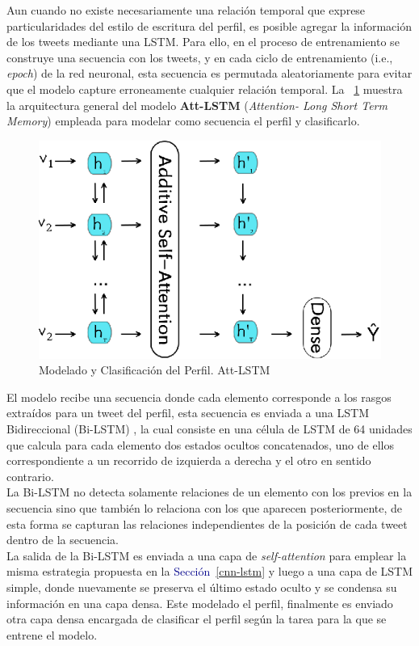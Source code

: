 	Aun cuando no existe necesariamente una relación temporal que exprese particularidades del estilo de escritura del perfil, es posible agregar la información de los tweets mediante una LSTM. Para ello, en el proceso de entrenamiento se construye una secuencia con los tweets, y en cada ciclo de entrenamiento (i.e., \textit{epoch}) de la red neuronal, esta secuencia es permutada aleatoriamente para evitar que el modelo capture erroneamente cualquier relación temporal. La \figurename~\ref{att_lstm} muestra la arquitectura general del modelo \textbf{Att-LSTM} (\textit{Attention- Long Short Term Memory}) empleada para modelar como secuencia el perfil y clasificarlo.
	
	\begin{figure}[!thb]
		\begin{center}
			\includegraphics[]{images/att_lstm.eps}
		\end{center}	
		\caption[Att - LSTM]{Modelado y Clasificación del Perfil. Att-LSTM}
		\label{att_lstm}
	\end{figure}
	
	El modelo recibe una secuencia donde cada elemento corresponde a los rasgos extraídos para un tweet del perfil, esta secuencia es enviada a una LSTM Bidireccional (Bi-LSTM) \citep{DBLP:journals/tsp/SchusterP97}, la cual consiste en una célula de LSTM de 64 unidades que calcula para cada elemento dos estados ocultos concatenados, uno de ellos correspondiente a un recorrido de izquierda a derecha y el otro en sentido contrario.
	\\
	La Bi-LSTM no detecta solamente relaciones de un elemento con los previos en la secuencia sino que también lo relaciona con los que aparecen posteriormente, de esta forma se capturan las relaciones independientes de la posición de cada tweet dentro de la secuencia.
	\\ 
	La salida de la Bi-LSTM es enviada a una capa de \textit{self-attention} para emplear la misma estrategia propuesta en la \textcolor{darkblue}{Sección~\ref{cnn-lstm}} y luego a una capa de LSTM simple, donde nuevamente se preserva el último estado oculto y se condensa su información en una capa densa. Este modelado el perfil, finalmente es enviado otra capa densa encargada de clasificar el perfil según la tarea para la que se entrene el modelo.
	
